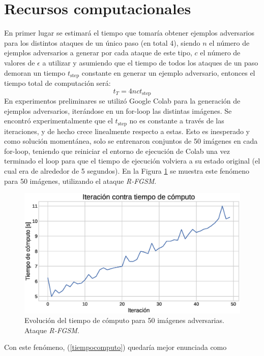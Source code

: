 \documentclass[conference]{IEEEtran}
\begin{document}
\section{Recursos computacionales}
En primer lugar se estimará el tiempo que tomaría obtener ejemplos adversarios para los distintos ataques de un único paso (en total 4), siendo $n$ el número de ejemplos adversarios a generar por cada ataque de este tipo, $c$ el número de valores de $\epsilon$ a utilizar y asumiendo que el tiempo de todos los ataques de un paso demoran un tiempo $t_{\text{step}}$ constante en generar un ejemplo adversario, entonces el tiempo total de computación será:
\begin{equation}\label{tiempocomputo}
    t_{T} = 4nct_{\text{step}}
\end{equation}
En experimentos preliminares se utilizó Google Colab para la generación de ejemplos adversarios, iterándose en un for-loop las distintas imágenes. Se encontró experimentalmente que el $t_{\text{step}}$ no es constante a través de las iteraciones, y de hecho crece linealmente respecto a estas. Esto es inesperado y como solución momentánea, solo se entrenaron conjuntos de 50 imágenes en cada for-loop, teniendo que reiniciar el entorno de ejecución de Colab una vez terminado el loop para que el tiempo de ejecución volviera a su estado original (el cual era de alrededor de 5 segundos). En la Figura \ref{tiempoejecucion} se muestra este fenómeno para 50 imágenes, utilizando el ataque \textit{R-FGSM}.
\begin{figure}[!t]
    \centering
    \includegraphics[width=\linewidth]{tiempo_de_computo.eps}
    \caption{Evolución del tiempo de cómputo para 50 imágenes adversarias. Ataque \textit{R-FGSM}.}
    \label{tiempoejecucion}
\end{figure}
Con este fenómeno, (\ref{tiempocomputo}) quedaría mejor enunciada como
\end{document}
